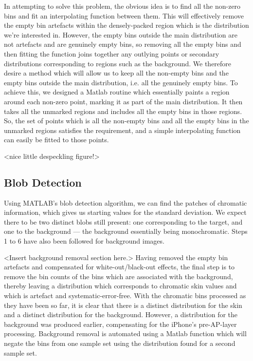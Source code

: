 In attempting to solve this problem, the obvious idea is to find all the non-zero bins and fit an interpolating function between them. This will effectively remove the empty bin artefacts within the densely-packed region which is the distribution we're interested in. However, the empty bins outside the main distribution are not artefacts and are genuinely empty bins, so removing all the empty bins and then fitting the function joins together any outlying points or secondary distributions corresponding to regions such as the background. We therefore desire a method which will allow us to keep all the non-empty bins and the empty bins outside the main distribution, i.e. all the genuinely empty bins. To achieve this, we designed a Matlab routine which essentially paints a region around each non-zero point, marking it as part of the main distribution. It then takes all the unmarked regions and includes all the empty bins in those regions. So, the set of points which is all the non-empty bins and all the empty bins in the unmarked regions satisfies the requirement, and a simple interpolating function can easily be fitted to those points.

<nice little despeckling figure!>


\subsection{Blob Detection}\label{sec:BlobDetection}
Using MATLAB's blob detection algorithm, we can find the patches of chromatic information, which gives us starting values for the standard deviation. We expect there to be two distinct blobs still present: one corresponding to the target, and one to the background --- the background essentially being monochromatic. Steps 1 to 6 have also been followed for background images. 

<Insert background removal section here.>
Having removed the empty bin artefacts and compensated for white-out/black-out effects, the final step is to remove the bin counts of the bins which are associated with the background, thereby leaving a distribution which corresponds to chromatic skin values and which is artefact and systematic-error-free. With the chromatic bins processed as they have been so far, it is clear that there is a distinct distribution for the skin and a distinct distribution for the background. However, a distribution for the background was produced earlier, compensating for the iPhone's pre-AP-layer processing. Background removal is automated using a Matlab function which will negate the bins from one sample set using the distribution found for a second sample set.

